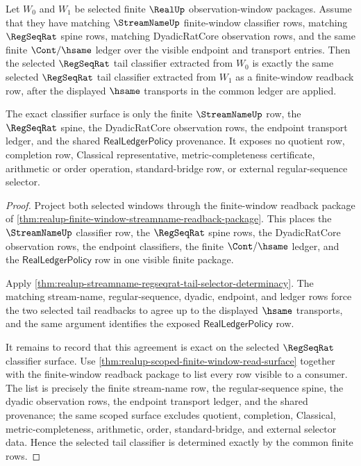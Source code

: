 \begin{theorem}
\label{thm:regseqrat-tail-classifier-exactness}
Let $W_0$ and $W_1$ be selected finite $\RealUp$ observation-window packages.
Assume that they have matching $\StreamNameUp$ finite-window classifier rows,
matching $\RegSeqRat$ spine rows, matching DyadicRatCore observation rows, and
the same finite $\Cont/\hsame$ ledger over the visible endpoint and transport
entries. Then the selected $\RegSeqRat$ tail classifier extracted from $W_0$
is exactly the same selected $\RegSeqRat$ tail classifier extracted from
$W_1$ as a finite-window readback row, after the displayed $\hsame$ transports
in the common ledger are applied.

The exact classifier surface is only the finite $\StreamNameUp$ row, the
$\RegSeqRat$ spine, the DyadicRatCore observation rows, the endpoint transport
ledger, and the shared $\mathsf{RealLedgerPolicy}$ provenance. It exposes no
quotient row, completion row, Classical representative, metric-completeness
certificate, arithmetic or order operation, standard-bridge row, or external
regular-sequence selector.
\end{theorem}
\begin{proof}
Project both selected windows through the finite-window readback package of
\autoref{thm:realup-finite-window-streamname-readback-package}. This places
the $\StreamNameUp$ classifier row, the $\RegSeqRat$ spine rows, the
DyadicRatCore observation rows, the endpoint classifiers, the finite
$\Cont/\hsame$ ledger, and the $\mathsf{RealLedgerPolicy}$ row in one visible
finite package.

Apply
\autoref{thm:realup-streamname-regseqrat-tail-selector-determinacy}. The
matching stream-name, regular-sequence, dyadic, endpoint, and ledger rows force
the two selected tail readbacks to agree up to the displayed $\hsame$
transports, and the same argument identifies the exposed
$\mathsf{RealLedgerPolicy}$ row.

It remains to record that this agreement is exact on the selected
$\RegSeqRat$ classifier surface. Use
\autoref{thm:realup-scoped-finite-window-read-surface} together with the
finite-window readback package to list every row visible to a consumer. The
list is precisely the finite stream-name row, the regular-sequence spine, the
dyadic observation rows, the endpoint transport ledger, and the shared
provenance; the same scoped surface excludes quotient, completion, Classical,
metric-completeness, arithmetic, order, standard-bridge, and external selector
data. Hence the selected tail classifier is determined exactly by the common
finite rows.
\end{proof}

